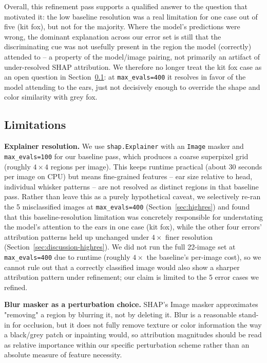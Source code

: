 Overall, this refinement pass supports a qualified answer to the question
that motivated it: the low baseline resolution was a real limitation for
one case out of five (kit fox), but not for the majority. Where the model's
predictions were wrong, the dominant explanation across our error set is
still that the discriminating cue was not usefully present in the region
the model (correctly) attended to -- a property of the model/image pairing,
not primarily an artifact of under-resolved SHAP attribution. We therefore
no longer treat the kit fox case as an open question in
Section~\ref{sec:limitations}: at \texttt{max\_evals=400} it resolves in
favor of the model attending to the ears, just not decisively enough to
override the shape and color similarity with grey fox.

\subsection{Limitations}
\label{sec:limitations}

\textbf{Explainer resolution.} We use \texttt{shap.Explainer} with an
\texttt{Image} masker and \texttt{max\_evals=100} for our baseline pass,
which produces a coarse superpixel grid (roughly $4\times4$ regions per
image). This keeps runtime practical (about 30 seconds per image on CPU)
but means fine-grained features -- ear size relative to head, individual
whisker patterns -- are not resolved as distinct regions in that baseline
pass. Rather than leave this as a purely hypothetical caveat, we
selectively re-ran the 5 misclassified images at \texttt{max\_evals=400}
(Section~\ref{sec:highres}) and found that this baseline-resolution
limitation was concretely responsible for understating the model's
attention to the ears in one case (kit fox), while the other four errors'
attribution patterns held up unchanged under $4\times$ finer resolution
(Section~\ref{sec:discussion-highres}). We did not run the full 22-image
set at \texttt{max\_evals=400} due to runtime (roughly $4\times$ the
baseline's per-image cost), so we cannot rule out that a correctly
classified image would also show a sharper attribution pattern under
refinement; our claim is limited to the 5 error cases we refined.

\textbf{Blur masker as a perturbation choice.} SHAP's Image masker
approximates "removing" a region by blurring it, not by deleting it. Blur
is a reasonable stand-in for occlusion, but it does not fully remove
texture or color information the way a black/grey patch or inpainting
would, so attribution magnitudes should be read as relative importance
within our specific perturbation scheme rather than an absolute measure of
feature necessity.

